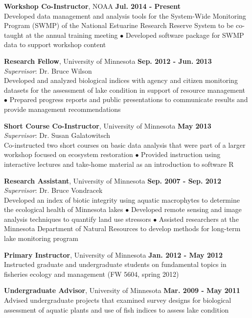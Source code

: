 \documentclass[letterpaper,12pt]{article}
\begin{document}
{\bf Workshop Co-Instructor}, NOAA \hfill {\bf Jul. 2014 - Present}\\
Developed data management and analysis tools for the System-Wide Monitoring Program (SWMP) of the National Estuarine Research Reserve System to be co-taught at the annual training meeting $\bullet$ Developed software package for SWMP data to support workshop content

{\bf Research Fellow}, University of Minnesota \hfill {\bf Sep. 2012 - Jun. 2013} \\
\textit{Supervisor}: Dr. Bruce Wilson \\
Developed and analyzed biological indices with agency and citizen monitoring datasets for the assessment of lake condition in support of resource management $\bullet$ Prepared progress reports and public presentations to communicate results and provide management recommendations

{\bf Short Course Co-Instructor}, University of Minnesota \hfill {\bf May 2013} \\
\textit{Supervisor}: Dr. Susan Galatowitsch \\
Co-instructed two short courses on basic data analysis that were part of a larger workshop focused on ecosystem restoration $\bullet$ Provided instruction using interactive lectures and take-home material as an introduction to software R

{\bf Research Assistant}, University of Minnesota \hfill {\bf Sep. 2007 - Sep. 2012} \\
\textit{Supervisor}: Dr. Bruce Vondracek \\
Developed an index of biotic integrity using aquatic macrophytes to determine the ecological health of Minnesota lakes $\bullet$ Developed remote sensing and image analysis techniques to quantify land use stressors $\bullet$ Assisted researchers at the Minnesota Department of Natural Resources to develop methods for long-term lake monitoring program

{\bf Primary Instructor}, University of Minnesota \hfill {\bf Jan. 2012 - May 2012} \\
Instructed graduate and undergraduate students on fundamental topics in fisheries ecology and management (FW 5604, spring 2012)

{\bf Undergraduate Advisor}, University of Minnesota \hfill {\bf Mar. 2009 - May 2011} \\
Advised undergraduate projects that examined survey designs for biological assessment of aquatic plants and use of fish indices to assess lake condition 
\end{document}
